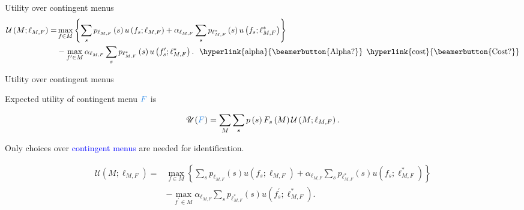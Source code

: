\documentclass[usenames,dvipsnames,aspectratio=169,11pt, envcountsect, handout]{beamer}
\begin{document}
\begin{frame}{Utility over contingent menus}
	\[
		\begin{aligned}
			\mathcal{U} \left(M ; \ell_{M, F} \right) = & \max _{f \in M}\left\{\sum_{s} p_{\ell_{M, F}} \left( s \right) u \left( f_{s} ; \ell_{M, F} \right) + \alpha_{\ell_{M, F}} \sum_{s} p_{\ell^{*}_{M, F}} \left( s \right) u \left( f_{s} ; \ell^{*}_{M, F} \right) \right\}                                  \\
			                                            & -\max _{f^{\prime} \in M} \alpha _{\ell_{M, F}} \sum_{s} p_{\ell^{*}_{M, F}} \left( s \right) u\left(f^{\prime}_{s} ; \ell^{*}_{M, F} \right) . \: \: \: \text{\hyperlink{alpha}{\beamerbutton{Alpha?}}} \: \: \text{\hyperlink{cost}{\beamerbutton{Cost?}}}
		\end{aligned}
	\]

\end{frame}

\begin{frame}[noframenumbering]{Utility over contingent menus}

	Expected utility of contingent menu \( \textcolor{blue}{F} \) is

	\vfill
	\[
		\mathscr{U}(\textcolor{blue}{F})= \sum_{M} \sum_{s} p \left( s \right) F_{s} \left( M \right) \mathcal{U} \left(M ; \ell_{M, F} \right) .
	\]

	\vfill

	Only choices over \textcolor{blue}{contingent menus} are needed for identification.

	\vfill

	{\begingroup

		\[
			\begin{aligned}
				\mathcal{U} \left(M ; \ell_{M, F} \right) = & \max _{f \in M}\left\{\sum_{s} p_{\ell_{M, F}} \left( s \right) u \left( f_{s} ; \ell_{M, F} \right) + \alpha_{\ell_{M, F}} \sum_{s} p_{\ell^{*}_{M, F}} \left( s \right) u \left( f_{s} ; \ell^{*}_{M, F} \right) \right\} \\
				                                            & -\max _{f^{\prime} \in M} \alpha _{\ell_{M, F}} \sum_{s} p_{\ell^{*}_{M, F}} \left( s \right) u\left(f^{\prime}_{s} ; \ell^{*}_{M, F} \right) .
			\end{aligned}
		\]
		\endgroup}

\end{frame}
\end{document}
